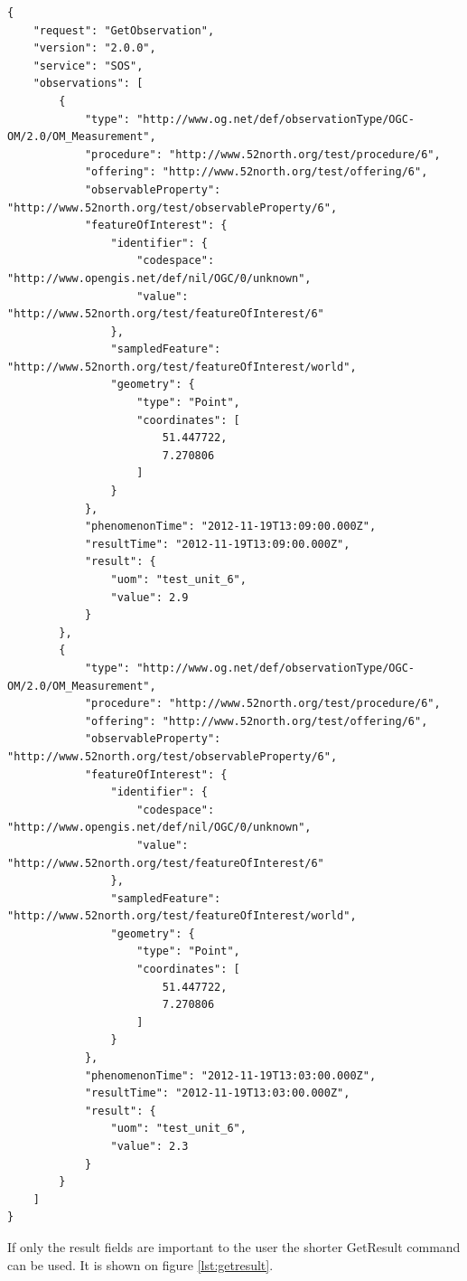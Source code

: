 \begin{lstlisting}[caption={JSON GetObservation response\label{lst:sendobs}}]
{
    "request": "GetObservation",
    "version": "2.0.0",
    "service": "SOS",
    "observations": [
        {
            "type": "http://www.og.net/def/observationType/OGC-OM/2.0/OM_Measurement",
            "procedure": "http://www.52north.org/test/procedure/6",
            "offering": "http://www.52north.org/test/offering/6",
            "observableProperty": "http://www.52north.org/test/observableProperty/6",
            "featureOfInterest": {
                "identifier": {
                    "codespace": "http://www.opengis.net/def/nil/OGC/0/unknown",
                    "value": "http://www.52north.org/test/featureOfInterest/6"
                },
                "sampledFeature": "http://www.52north.org/test/featureOfInterest/world",
                "geometry": {
                    "type": "Point",
                    "coordinates": [
                        51.447722,
                        7.270806
                    ]
                }
            },
            "phenomenonTime": "2012-11-19T13:09:00.000Z",
            "resultTime": "2012-11-19T13:09:00.000Z",
            "result": {
                "uom": "test_unit_6",
                "value": 2.9
            }
        },
        {
            "type": "http://www.og.net/def/observationType/OGC-OM/2.0/OM_Measurement",
            "procedure": "http://www.52north.org/test/procedure/6",
            "offering": "http://www.52north.org/test/offering/6",
            "observableProperty": "http://www.52north.org/test/observableProperty/6",
            "featureOfInterest": {
                "identifier": {
                    "codespace": "http://www.opengis.net/def/nil/OGC/0/unknown",
                    "value": "http://www.52north.org/test/featureOfInterest/6"
                },
                "sampledFeature": "http://www.52north.org/test/featureOfInterest/world",
                "geometry": {
                    "type": "Point",
                    "coordinates": [
                        51.447722,
                        7.270806
                    ]
                }
            },
            "phenomenonTime": "2012-11-19T13:03:00.000Z",
            "resultTime": "2012-11-19T13:03:00.000Z",
            "result": {
                "uom": "test_unit_6",
                "value": 2.3
            }
        }
    ]
}
\end{lstlisting}

If only the result fields are important to the user the shorter GetResult command can be used. It is shown on figure \ref{lst:getresult}.

